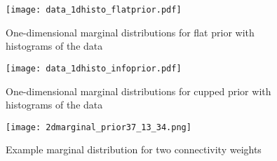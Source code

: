 \begin{figure}[p]
  \centering
\texttt{[image: data\_1dhisto\_flatprior.pdf]}
\caption{One-dimensional marginal distributions for flat prior with
  histograms of the data}
\label{fig:1dmarginals_flat_histo}
\end{figure}
% 
% 
% 
% 
\begin{figure}[p]
  \centering
\texttt{[image: data\_1dhisto\_infoprior.pdf]}
\caption{One-dimensional marginal distributions for cupped prior with
  histograms of the data}
\label{fig:1dmarginals_info_histo}
\end{figure}


\begin{figure}[b]
  \centering
\texttt{[image: 2dmarginal\_prior37\_13\_34.png]}
\caption{Example marginal distribution for two connectivity weights}
\label{fig:2dmarginal}
\end{figure}

